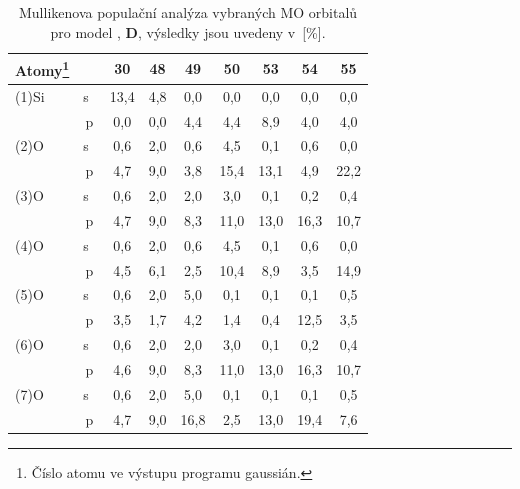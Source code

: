 \documentclass[
digital, %
table,   %
nolof,     %
nolot,     %
oneside,
]{fithesis3}
\begin{document}
\begin{table}[H]
\begin{minipage}{\textwidth}
\begin{center}
\caption{Mullikenova populační analýza vybraných MO orbitalů pro model , \textbf{D}, výsledky jsou uvedeny v~[\%].}
\begin{tabular}{|l|c|c|c|c|c|c|c|c|}
\hline
Atomy\footnote{Číslo atomu ve výstupu programu gaussián.}  \label{si_och3_6_MPA}&  & 30 & 48 & 49 & 50 & 53 & 54 & 55 \\ \hline
(1)Si & s~& 13,4  & 4,8  & 0,0  & 0,0  & 0,0  & 0,0  & 0,0  \\ \hline
& p & 0,0  & 0,0  & 4,4  & 4,4  & 8,9  & 4,0  & 4,0  \\ \hline
(2)O & s~& 0,6  & 2,0  & 0,6  & 4,5  & 0,1  & 0,6  & 0,0  \\ \hline
& p & 4,7  & 9,0  & 3,8  & 15,4  & 13,1  & 4,9  & 22,2  \\ \hline
(3)O & s~& 0,6  & 2,0  & 2,0  & 3,0  & 0,1  & 0,2  & 0,4  \\ \hline
& p & 4,7  & 9,0  & 8,3  & 11,0  & 13,0  & 16,3  & 10,7  \\ \hline
(4)O & s~& 0,6  & 2,0  & 0,6  & 4,5  & 0,1  & 0,6  & 0,0  \\ \hline
& p & 4,5  & 6,1  & 2,5  & 10,4  & 8,9  & 3,5  & 14,9  \\ \hline
(5)O & s~& 0,6  & 2,0  & 5,0  & 0,1  & 0,1  & 0,1  & 0,5  \\ \hline
& p & 3,5  & 1,7  & 4,2  & 1,4  & 0,4  & 12,5  & 3,5  \\ \hline
(6)O & s~& 0,6  & 2,0  & 2,0  & 3,0  & 0,1  & 0,2  & 0,4  \\ \hline
& p & 4,6  & 9,0  & 8,3  & 11,0  & 13,0  & 16,3  & 10,7  \\ \hline
(7)O & s~& 0,6  & 2,0  & 5,0  & 0,1  & 0,1  & 0,1  & 0,5  \\ \hline
& p & 4,7  & 9,0  & 16,8  & 2,5  & 13,0  & 19,4  & 7,6  \\ \hline
\end{tabular}\end{center}\end{minipage}\end{table}
\end{document}
